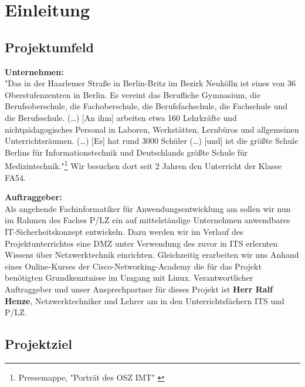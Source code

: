 \section{Einleitung}
\label{sec:Einleitung}

\subsection{Projektumfeld} 
\label{sec:Projektumfeld}
   
    \textbf{Unternehmen:}\\
    "Das \betriebAcronym{} in der Haarlemer Straße in Berlin-Britz im Bezirk Neukölln ist eines von 36 Oberstufenzentren in Berlin. 
    Es vereint das Berufliche Gymnasium, die Berufsoberschule, die Fachoberschule, die Berufsfachschule, die Fachschule und die Berufsschule. (\dots)
    [An ihm] arbeiten etwa 160 Lehrkräfte und nichtpädagogisches Personal in Laboren, Werkstätten, Lernbüros und allgemeinen Unterrichtsräumen. (\dots)
    [Es] hat rund 3000 Schüler (\dots) [und] ist die größte Schule Berlins für Informationstechnik und Deutschlands größte Schule für Medizintechnik."\footnote{Pressemappe, "Porträt des OSZ IMT" \citet{Web:2017:www.oszimt.deNoStoparg1}}
    Wir besuchen dort seit 2  Jahren den Unterricht der Klasse \ac{FA54}.
    
    \textbf{Auftraggeber:}\\
    Als angehende Fachinformatiker für Anwendungsentwicklung am \betriebAcronym{} sollen wir nun im Rahmen des Faches \ac{P/LZ} ein auf mittelständige Unternehmen anwendbares IT-Sicherheitskonzept entwickeln. 
    Dazu werden wir im Verlauf des Projektunterrichtes eine \ac{DMZ} unter Verwendung des zuvor in \ac{ITS} erlernten Wissens über Netzwerktechnik einrichten. 
    Gleichzeitig erarbeiten wir uns Anhand eines Online-Kurses der Cisco-Networking-Academy die für das Projekt benötigten Grundkenntnisse im Umgang mit Linux.
    Verantwortlicher Auftraggeber und unser Ansprechpartner für dieses Projekt ist \textbf{Herr Ralf Henze}, Netzwerktechniker und Lehrer am \betriebAcronym{} in den Unterrichtsfächern \ac{ITS} und \ac{P/LZ}.


\subsection{Projektziel} 
\label{sec:Projektziel}

